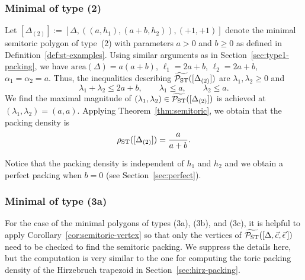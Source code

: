 \documentclass[10pt,a4paper]{amsart}
\numberwithin{equation}{section}
\newcommand{\De}{\Delta}
\newcommand{\PSTtilde}{\widetilde{\mathcal{P}_{\rm ST}}}
\newcommand{\stpoly}{[\De,\vec{c},\vec{\epsilon}\,]}
\theoremstyle{definition}
\theoremstyle{plain}
\theoremstyle{plain}
\begin{document}
\subsubsection{Minimal of type (2)} Let
$[\De_{(2)}] := [\De,((a,h_1),(a+b,h_2)),(+1,+1)]$
denote the minimal semitoric polygon of type~(2) with parameters $a>0$ and $b\geq 0$ as defined in Definition~\ref{def:st-examples}. Using similar arguments as in Section~\ref{sec:type1-packing}, we have $\textrm{area}(\De) = a(a+b)$, $\ell_1 = 2a+b$, $\ell_2 = 2a+b$, $\alpha_1 = \alpha_2 = a$. Thus, the inequalities describing $\PSTtilde([\De_{(2)}])$ are $\lambda_1,\lambda_2\geq 0$ and
\begin{equation*}
\lambda_1+\lambda_2 \leq 2a+b,\qquad
 \lambda_1 \leq a,\qquad
 \lambda_2 \leq a.
\end{equation*}
We find the maximal magnitude of $(\lambda_1,\lambda_2)\in\PSTtilde([\De_{(2)}])$ is achieved at $(\lambda_1,\lambda_2) = (a,a)$.
Applying Theorem~\ref{thm:semitoric}, we obtain that the packing density is
\begin{equation}\label{eqn:stpack-2}
\rho_{{\rm ST}} ([\De_{(2)}]) = \frac{a}{a+b}.
\end{equation}

Notice that the packing density is independent of $h_1$ and $h_2$ and we obtain a perfect packing when $b=0$ (see Section~\ref{sec:perfect}).

\subsubsection{Minimal of type (3a)}
For the case of the minimal polygons of types (3a), (3b), and (3c), it is helpful to apply Corollary~\ref{cor:semitoric-vertex} so that only the vertices of $\PSTtilde(\stpoly)$ need to be checked to find the semitoric packing.
We suppress the details here, but the computation is very similar to the one for computing the toric packing density of the Hirzebruch trapezoid in Section~\ref{sec:hirz-packing}.
\end{document}

